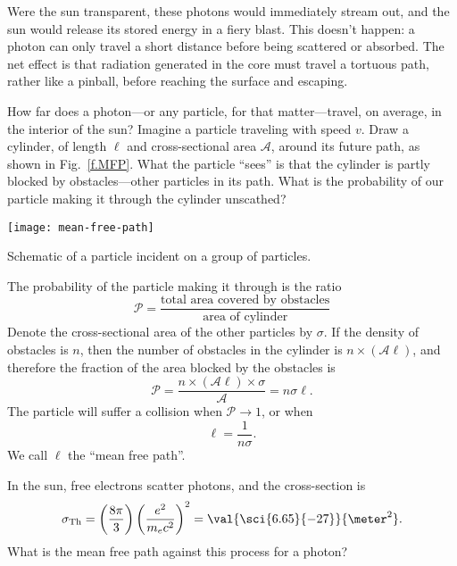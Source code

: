 
  Were the sun transparent, these photons would immediately stream out, and the sun would release its stored energy in a fiery blast.  This doesn't happen: a photon can only travel a short distance before being scattered or absorbed. The net effect is that radiation generated in the core must travel a tortuous path, rather like a pinball, before reaching the surface and escaping.

How far does a photon---or any particle, for that matter---travel, on average, in the interior of the sun? Imagine a particle traveling with speed $v$.  Draw a cylinder, of length $\ell$ and cross-sectional area $\mathcal{A}$, around its future path, as shown in Fig.~\ref{f.MFP}. What the particle ``sees'' is that the cylinder is partly blocked by obstacles---other particles in its path. What is the probability of our particle making it through the cylinder unscathed?

\begin{marginfigure}
    \texttt{[image: mean-free-path]}
    \caption{\label{f.MFP} Schematic of a particle incident on a group of particles.}
\end{marginfigure}

The probability of the particle making it through is the ratio
\[
    \mathcal{P} = \frac{\textrm{total area covered by obstacles}}{\textrm{area of cylinder}}
\]
Denote the cross-sectional area of the other particles by $\sigma$.  If the density of obstacles is $n$, then the number of obstacles in the cylinder is $n\times(\mathcal{A}\ell)$, and therefore the fraction of the area blocked by the obstacles is
\begin{equation}
    \mathcal{P} = \frac{n\times(\mathcal{A}\ell)\times\sigma}{\mathcal{A}} = n\sigma\ell.
\label{e.prob-MFP}
\end{equation}
The particle will suffer a collision when $\mathcal{P}\to 1$, or when
\begin{equation}\label{e.MFP}
    \ell = \frac{1}{n\sigma}.
\end{equation}
We call $\ell$ the ``mean free path''.

\begin{exercisebox}
    In the sun, free electrons scatter photons, and the cross-section is
    \[
    \sigma_{\mathrm{Th}} = \left(\frac{8\pi}{3}\right)\left(\frac{e^2}{m_e c^2}\right)^2 = \val{\sci{6.65}{-27}}{\meter^2}.
    \]
    What is the mean free path against this process for a photon?
\end{exercisebox}

